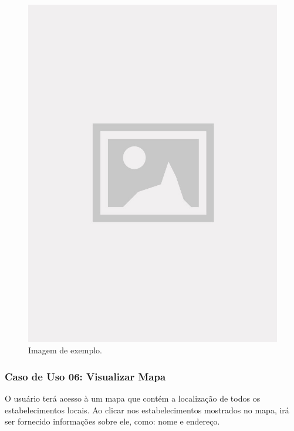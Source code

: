 \begin{figure}[!htb]
\centering
\caption{Imagem de exemplo.}
\includegraphics[width=\linewidth]{figuras/placeholder.jpg}
\end{figure}

\subsubsection{Caso de Uso 06: Visualizar Mapa}

O usuário terá acesso à um mapa que contém a localização de todos os estabelecimentos locais. Ao clicar nos estabelecimentos mostrados no mapa, irá ser fornecido informações sobre ele, como: nome e endereço.


